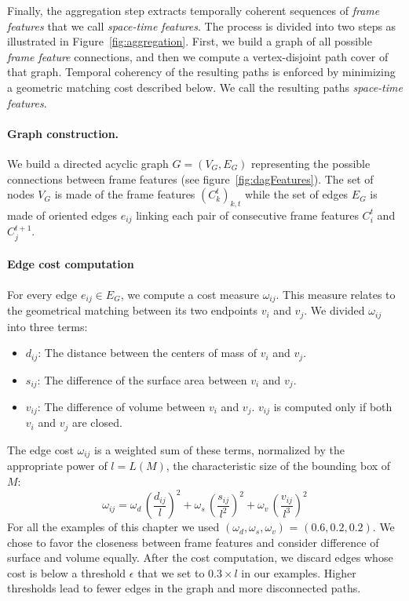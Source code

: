 Finally, the aggregation step extracts temporally coherent sequences of \emph{frame features} that we call \emph{space-time features}. 
The process is divided into two steps as illustrated in Figure~\ref{fig:aggregation}.
First, we build a graph of all possible \emph{frame feature} connections, and then we compute a vertex-disjoint path cover of that graph. Temporal coherency of the resulting paths is enforced by minimizing a geometric matching cost described below. We call the resulting paths \emph{space-time features}.

\paragraph*{Graph construction.}

We build a directed acyclic graph $G = (V_G, E_G) $ representing the possible connections between frame features (see figure~\ref{fig:dagFeatures}).
The set of nodes $V_{G}$ is made of the frame features $\left(C_{k}^{t}\right)_{k,t}$ while the set of edges $E_{G}$ is made of oriented edges $e_{ij}$ linking each pair of consecutive frame features $C_{i}^{t}$ and $C_{j}^{t+1}$.

\paragraph{Edge cost computation}

For every edge $e_{ij}\in E_{G}$, we compute a cost measure \(\omega_{ij}\). This measure relates to the geometrical matching between its two endpoints $v_{i}$ and $v_{j}$.
We divided \(\omega_{ij}\) into three terms:
\begin{itemize}
    \item $d_{ij}$: The distance between the centers of mass of $v_{i}$ and $v_{j}$.
    \item $s_{ij}$: The difference of the surface area between $v_{i}$ and $v_{j}$.
    \item $v_{ij}$: The difference of volume between $v_{i}$ and $v_{j}$. $v_{ij}$ is computed only if both $v_{i}$ and $v_{j}$ are closed.
\end{itemize}
The edge cost $\omega_{ij}$ is a weighted sum of these terms, normalized by the appropriate power of $l=L(M)$, the characteristic size of the bounding box of $M$:
\begin{equation}
\label{eq:costfunction}
\displaystyle \omega_{ij} = 
\omega_{d}\, \left(\frac{d_{ij}}{l  }\right)^2 +
\omega_{s}\, \left(\frac{s_{ij}}{l^2}\right)^2 + 
\omega_{v}\, \left(\frac{v_{ij}}{l^3}\right)^2
\end{equation}
For all the examples of this chapter we used $\left( \omega_{d}, \omega_{s}, \omega_{v} \right)$ = $\left(0.6,0.2,0.2\right)$. We chose to favor the closeness between frame features and consider difference of surface and volume equally. After the cost computation, we discard edges whose cost is below a threshold $\epsilon$ that we set to $0.3 \times l$ in our examples. Higher thresholds lead to fewer edges in the graph and more disconnected paths.


